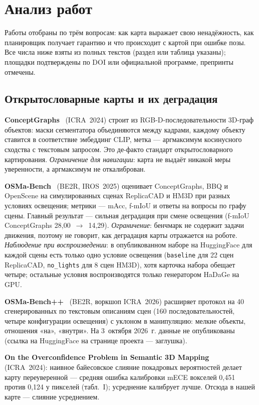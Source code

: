 \section{Анализ работ}

Работы отобраны по трём вопросам: как карта выражает свою ненадёжность, как планировщик получает гарантию и что происходит с картой при ошибке позы. Все числа ниже взяты из полных текстов (раздел или таблица указаны); площадки подтверждены по DOI или официальной программе, препринты отмечены.

\subsection*{Открытословарные карты и их деградация}

\textbf{ConceptGraphs}~\cite{conceptgraphs} (ICRA~2024) строит из RGB-D-последовательности 3D-граф объектов: маски сегментатора объединяются между кадрами, каждому объекту ставится в соответствие эмбеддинг CLIP, метка --- аргмаксимум косинусного сходства с текстовым запросом. Это де-факто стандарт открытословарного картирования. \emph{Ограничение для навигации}: карта не выдаёт никакой меры уверенности, а аргмаксимум не откалиброван.

\textbf{OSMa-Bench}~\cite{osmabench} (BE2R, IROS~2025) оценивает ConceptGraphs, BBQ и OpenScene на симулированных сценах ReplicaCAD и HM3D при разных условиях освещения; метрики --- mAcc, f-mIoU и ответы на вопросы по графу сцены. Главный результат --- сильная деградация при смене освещения (f-mIoU ConceptGraphs 28{,}00~$\to$~14{,}29). \emph{Ограничение}: бенчмарк не содержит задачи движения, поэтому не говорит, как деградация карты отражается на роботе. \emph{Наблюдение при воспроизведении}: в опубликованном наборе на HuggingFace для каждой сцены есть только одно условие освещения (\texttt{baseline} для 22 сцен ReplicaCAD, \texttt{no\_lights} для 8 сцен HM3D), хотя карточка набора обещает четыре; остальные условия воспроизводятся только генератором HaDaGe на GPU.

\textbf{OSMa-Bench++}~\cite{osmabenchpp} (BE2R, воркшоп ICRA~2026) расширяет протокол на 40 сгенерированных по текстовым описаниям сцен (160 последовательностей, четыре конфигурации освещения) с уклоном в манипуляцию: мелкие объекты, отношения «на», «внутри». На 3~октября 2026~г. данные не опубликованы (ссылка на HuggingFace на странице проекта --- заглушка).

\textbf{On the Overconfidence Problem in Semantic 3D Mapping}~\cite{overconf} (ICRA~2024): наивное байесовское слияние покадровых вероятностей делает карту переуверенной --- средняя ошибка калибровки mECE вокселей 0{,}451 против 0{,}124 у пикселей (табл.~I); усреднение калибрует лучше. Отсюда в нашей карте --- слияние усреднением.

